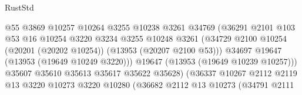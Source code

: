 \begin{lexlean}{RustStd}
\begin{coremodule}
                                            @55
                                            @3869
                                            @10257
                                            @10264
                                            @3255
                                            @10238
                                            @3261
                                            @34769
                                            (@36291
                                              @2101
                                              @103
                                              @53
                                              @16
                                              @10254
                                              @3220
                                              @3234
                                              @3255
                                              @10248
                                              @3261
                                              (@34729
                                                @2100
                                                @10254
                                                (@20201 (@20202 @10254))
                                                (@13953 (@20207 @2100 @53)))
                                              @34697
                                              @19647
                                              (@13953 (@19649 @10249 @3220)))
                                            @19647
                                            (@13953 (@19649 @10239 @10257)))
                                          @35607
                                          @35610
                                          @35613
                                          @35617
                                          @35622
                                          @35628)
                                        (@36337
                                          @10267
                                          @2112
                                          @2119
                                          @13
                                          @3220
                                          @10273
                                          @3220
                                          @10280
                                          (@36682
                                            @2112
                                            @13
                                            @10273
                                            (@34791
                                              @2111

\end{coremodule}
\end{lexlean}
